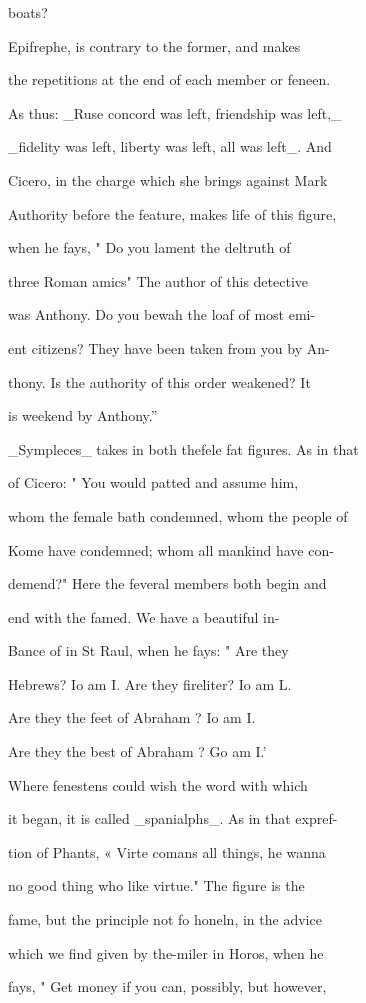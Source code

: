 \documentclass{article}
\begin{document}
boats?

Epifrephe, is contrary to the former, and makes

the repetitions at the end of each member or feneen.

As thus: \_Ruse concord was left, friendship was left,\_

\_fidelity was left, liberty was left, all was left\_. And

Cicero, in the charge which she brings against Mark

Authority before the feature, makes life of this figure,

when he fays, " Do you lament the deltruth of

three Roman amics" The author of this detective

was Anthony. Do you bewah the loaf of most emi-

ent citizens? They have been taken from you by An-

thony. Is the authority of this order weakened? It

is weekend by Anthony.”

\_Sympleces\_ takes in both thefele fat figures. As in that

of Cicero: " You would patted and assume him,

whom the female bath condemned, whom the people of

Kome have condemned; whom all mankind have con-

demend?" Here the feveral members both begin and

end with the famed. We have a beautiful in-

Bance of in St Raul, when he fays: " Are they

Hebrews? Io am I. Are they fireliter? Io am L.

Are they the feet of Abraham ? Io am I.

Are they the best of Abraham ? Go am I.’

Where fenestens could wish the word with which

it began, it is called \_spanialphs\_. As in that expref-

tion of Phants, « Virte comans all things, he wanna

no good thing who like virtue." The figure is the

fame, but the principle not fo honeln, in the advice

which we find given by the-miler in Horos, when he

fays, " Get money if you can, possibly, but however,
\end{document}
